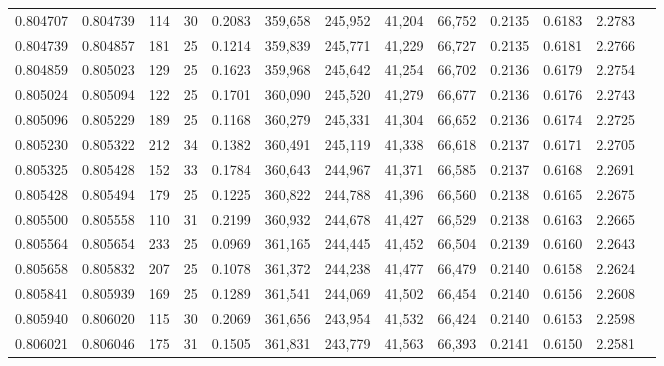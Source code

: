 \begin{tabular}{rrrrrrrrrrrrr}
0.804707 & 0.804739 &   114 &  30 &                                     0.2083 & 359,658 & 245,952 &  41,204 &  66,752 & 0.2135 & 0.6183 & 2.2783 \\
0.804739 & 0.804857 &   181 &  25 &                                     0.1214 & 359,839 & 245,771 &  41,229 &  66,727 & 0.2135 & 0.6181 & 2.2766 \\
0.804859 & 0.805023 &   129 &  25 &                                     0.1623 & 359,968 & 245,642 &  41,254 &  66,702 & 0.2136 & 0.6179 & 2.2754 \\
0.805024 & 0.805094 &   122 &  25 &                                     0.1701 & 360,090 & 245,520 &  41,279 &  66,677 & 0.2136 & 0.6176 & 2.2743 \\
0.805096 & 0.805229 &   189 &  25 &                                     0.1168 & 360,279 & 245,331 &  41,304 &  66,652 & 0.2136 & 0.6174 & 2.2725 \\
0.805230 & 0.805322 &   212 &  34 &                                     0.1382 & 360,491 & 245,119 &  41,338 &  66,618 & 0.2137 & 0.6171 & 2.2705 \\
0.805325 & 0.805428 &   152 &  33 &                                     0.1784 & 360,643 & 244,967 &  41,371 &  66,585 & 0.2137 & 0.6168 & 2.2691 \\
0.805428 & 0.805494 &   179 &  25 &                                     0.1225 & 360,822 & 244,788 &  41,396 &  66,560 & 0.2138 & 0.6165 & 2.2675 \\
0.805500 & 0.805558 &   110 &  31 &                                     0.2199 & 360,932 & 244,678 &  41,427 &  66,529 & 0.2138 & 0.6163 & 2.2665 \\
0.805564 & 0.805654 &   233 &  25 &                                     0.0969 & 361,165 & 244,445 &  41,452 &  66,504 & 0.2139 & 0.6160 & 2.2643 \\
0.805658 & 0.805832 &   207 &  25 &                                     0.1078 & 361,372 & 244,238 &  41,477 &  66,479 & 0.2140 & 0.6158 & 2.2624 \\
0.805841 & 0.805939 &   169 &  25 &                                     0.1289 & 361,541 & 244,069 &  41,502 &  66,454 & 0.2140 & 0.6156 & 2.2608 \\
0.805940 & 0.806020 &   115 &  30 &                                     0.2069 & 361,656 & 243,954 &  41,532 &  66,424 & 0.2140 & 0.6153 & 2.2598 \\
0.806021 & 0.806046 &   175 &  31 &                                     0.1505 & 361,831 & 243,779 &  41,563 &  66,393 & 0.2141 & 0.6150 & 2.2581 \\

\end{tabular}
